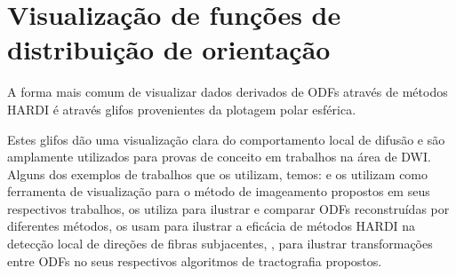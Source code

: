\documentclass[
    12pt,                %
    oneside,            %
    a4paper,            %
    english,            %
    french,                %
    spanish,            %
    brazil                %
    ]{abntex2}
\begin{document}






\section{Visualização de funções de distribuição de orientação}

A forma mais comum de visualizar dados derivados de ODFs através de métodos HARDI é através glifos provenientes da plotagem polar esférica.

Estes glifos dão uma visualização clara do comportamento local de difusão e são amplamente utilizados para provas de conceito em trabalhos na área de DWI. Alguns dos exemplos de trabalhos que os utilizam, temos:  e  os utilizam como ferramenta de visualização para o método de imageamento propostos em seus respectivos trabalhos,  os utiliza para ilustrar e comparar ODFs reconstruídas por diferentes métodos,  os usam para ilustrar a eficácia de métodos HARDI na detecção local de direções de fibras subjacentes, , para ilustrar transformações entre ODFs no seus respectivos algoritmos de tractografia propostos.
\end{document}
